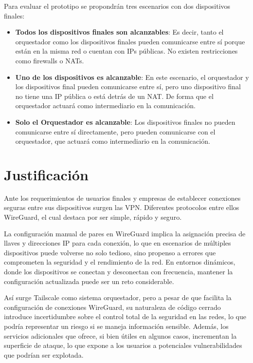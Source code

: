 \documentclass[letterpaper,12pt,oneside]{article}
\begin{document}
Para evaluar el prototipo se propondrán tres escenarios con dos dispositivos finales:
\begin{itemize}
    \item \textbf{Todos los dispositivos finales son alcanzables}: Es decir, tanto el orquestador como los dispositivos finales pueden comunicarse entre sí porque están en la misma red o cuentan con IPs públicas. No existen restricciones como firewalls o NATs.
    
    \item \textbf{Uno de los dispositivos es alcanzable}: En este escenario, el orquestador y los dispositivos final pueden comunicarse entre sí, pero uno dispositivo final no tiene una IP pública o está detrás de un NAT. De forma que el orquestador actuará como intermediario en la comunicación.
    
    \item \textbf{Solo el Orquestador es alcanzable}: Los dispositivos finales no pueden comunicarse entre sí directamente, pero pueden comunicarse con el orquestador, que actuará como intermediario en la comunicación.
\end{itemize}


\section{Justificación}
    
Ante los requerimientos de usuarios finales y empresas de establecer conexiones seguras entre sus dispositivos surgen las VPN. Diferentes protocolos entre ellos WireGuard, el cual destaca por ser simple, rápido y seguro.

La configuración manual de pares en WireGuard implica la asignación precisa de llaves y direcciones IP para cada conexión, lo que en escenarios de múltiples dispositivos puede volverse no solo tedioso, sino propenso a errores que comprometen la seguridad y el rendimiento de la red. En entornos dinámicos, donde los dispositivos se conectan y desconectan con frecuencia, mantener la configuración actualizada puede ser un reto considerable.

Así surge Tailscale como sistema orquestador, pero a pesar de que facilita la configuración de conexiones WireGuard, su naturaleza de código cerrado introduce incertidumbre sobre el control total de la seguridad en las redes, lo que podría representar un riesgo si se maneja información sensible. Además, los servicios adicionales que ofrece, si bien útiles en algunos casos, incrementan la superficie de ataque, lo que expone a los usuarios a potenciales vulnerabilidades que podrían ser explotada.
\end{document}
